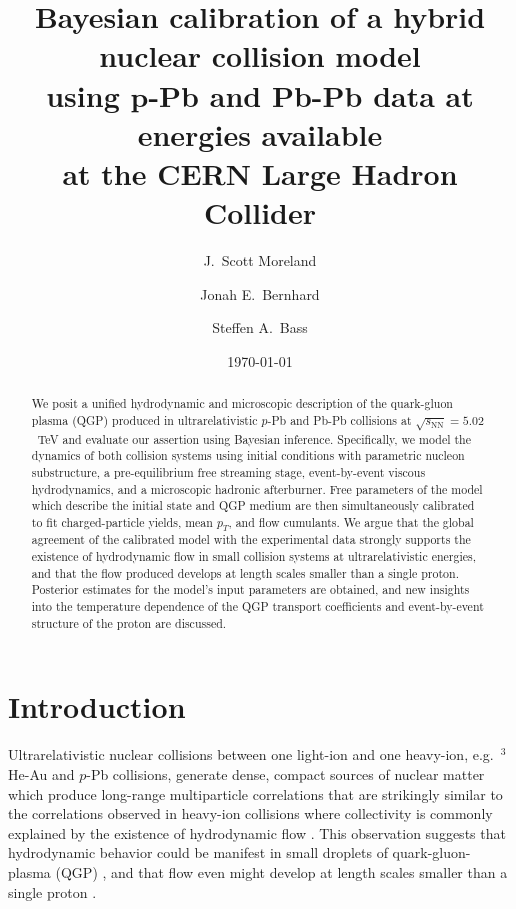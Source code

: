 \documentclass[aps,prc,reprint,amsmath,nofootinbib]{revtex4-1}
\newcommand{\sqrts}{\sqrt{s_\mathrm{NN}}}
\begin{document}
\title{
  Bayesian calibration of a hybrid nuclear collision model\\
  using $\boldsymbol p$-Pb and Pb-Pb data at energies available\\
  at the CERN Large Hadron Collider
}

\author{J.\ Scott Moreland}
\author{Jonah E.\ Bernhard}
\author{Steffen A.\ Bass}


\date{\today}

\begin{abstract}
  We posit a unified hydrodynamic and microscopic description of the quark-gluon plasma (QGP) produced in ultrarelativistic $p$-Pb and Pb-Pb collisions at $\sqrts=5.02$~TeV and evaluate our assertion using Bayesian inference.
  Specifically, we model the dynamics of both collision systems using initial conditions with parametric nucleon substructure, a pre-equilibrium free streaming stage, event-by-event viscous hydrodynamics, and a microscopic hadronic afterburner.
  Free parameters of the model which describe the initial state and QGP medium are then simultaneously calibrated to fit charged-particle yields, mean $p_T$, and flow cumulants.
  We argue that the global agreement of the calibrated model with the experimental data strongly supports the existence of hydrodynamic flow in small collision systems at ultrarelativistic energies, and that the flow produced develops at length scales smaller than a single proton.
  Posterior estimates for the model's input parameters are obtained, and new insights into the temperature dependence of the QGP transport coefficients and event-by-event structure of the proton are discussed.
\end{abstract}

\maketitle

\section{Introduction}

Ultrarelativistic nuclear collisions between one light-ion and one heavy-ion, e.g.\ $^3$He-Au and $p$-Pb collisions, generate dense, compact sources of nuclear matter which produce long-range multiparticle correlations that are strikingly similar to the correlations observed in heavy-ion collisions where collectivity is commonly explained by the existence of hydrodynamic flow \cite{CMS:2012qk, Abelev:2012ola, Aad:2012gla, Adare:2015ctn}.
This observation suggests that hydrodynamic behavior could be manifest in small droplets of quark-gluon-plasma (QGP) \cite{Bozek:2011if, Bozek:2013uha}, and that flow even might develop at length scales smaller than a single proton \cite{Schenke:2014zha}.
\end{document}
